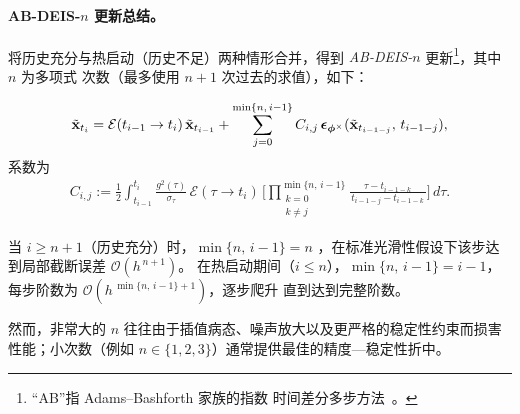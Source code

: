 
\paragraph{AB-DEIS-$n$ 更新总结。}
将历史充分与热启动（历史不足）两种情形合并，得到
\emph{AB-DEIS-$n$} 更新\footnote{“AB”指 Adams–Bashforth 家族的指数
时间差分多步方法~\citep{hochbruck2010exponential}。}，其中 $n$ 为多项式
次数（最多使用 $n{+}1$ 次过去的求值），如下：
\begin{mdframed}
\begin{align*}
\tilde{{\mathbf{x}}}_{t_i}
= \mathcal{E}(t_{i-1} \to t_i)\,\tilde{{\mathbf{x}}}_{t_{i-1}}
+ \sum_{j=0}^{\min\{n,\, i-1\}} C_{i,j}\,{\bm{\epsilon}}_{\bm{\phi}^\times}(\tilde{{\mathbf{x}}}_{t_{i-1-j}},\,t_{i-1-j}),
\end{align*}
系数为
\begin{align*}
C_{i,j}
:= \frac{1}{2} \int_{t_{i-1}}^{t_i}
\frac{g^2(\tau)}{\sigma_\tau}\,\mathcal{E}(\tau \to t_i)\,
\Bigg[\prod_{\substack{k=0\\k\neq j}}^{\min\{n,\, i-1\}}
\frac{\tau - t_{i-1-k}}{\,t_{i-1-j} - t_{i-1-k}\,}\Bigg]\,d\tau.
\end{align*}
\end{mdframed}

当 $i\ge n{+}1$（历史充分）时，$\min\{n,\, i-1\}=n$
，在标准光滑性假设下该步达到局部截断误差 $\mathcal O(h^{\,n+1})$。
在热启动期间（$i\le n$），$\min\{n,\, i-1\}=i-1$，每步阶数为 $\mathcal O(h^{\,\min\{n,\, i-1\}+1})$，逐步爬升
直到达到完整阶数。

然而，非常大的 $n$ 往往由于插值病态、噪声放大以及更严格的稳定性约束而损害性能；小次数（例如 $n \in \{1,2,3\}$）通常提供最佳的精度—稳定性折中。

